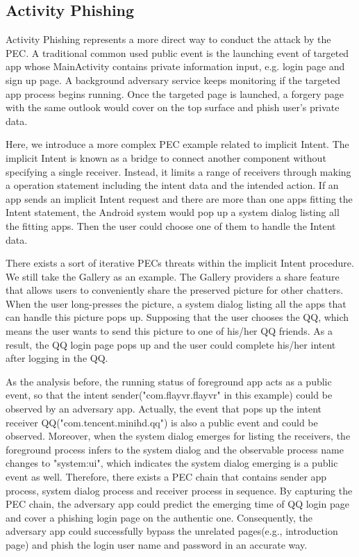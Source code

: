 \documentclass{sig-alternate-05-2015}
\begin{document}
\subsection{Activity Phishing}
Activity Phishing represents a more direct way to conduct the attack by the PEC. A traditional common used public event is the launching event of targeted app whose MainActivity contains private information input, e.g. login page and sign up page. A background adversary service keeps monitoring if the targeted app process begins running. Once the targeted page is launched, a forgery page with the same outlook would cover on the top surface and phish user's private data.

Here, we introduce a more complex PEC example related to implicit Intent. The implicit Intent is known as a bridge to connect another component without specifying a single receiver. Instead, it limits a range of receivers through making a operation statement including the intent data and the intended action. If an app sends an implicit Intent request and there are more than one apps fitting the Intent statement, the Android system would pop up a system dialog listing all the fitting apps. Then the user could choose one of them to handle the Intent data.

There exists a sort of iterative PECs threats within the implicit Intent procedure. We still take the Gallery as an example. The Gallery providers a share feature that allows users to conveniently share the preserved picture for other chatters. When the user long-presses the picture, a system dialog listing all the apps that can handle this picture pops up. Supposing that the user chooses the QQ, which means the user wants to send this picture to one of his/her QQ friends. As a result, the QQ login page pops up and the user could complete his/her intent after logging in the QQ.

As the analysis before, the running status of foreground app acts as a public event, so that the intent sender("com.flayvr.flayvr" in this example) could be observed by an adversary app. Actually, the event that pops up the intent receiver QQ("com.tencent.minihd.qq") is also a public event and could be observed. Moreover, when the system dialog emerges for listing the receivers, the foreground process infers to the system dialog and the observable process name changes to "system:ui", which indicates the system dialog emerging is a public event as well. Therefore, there exists a PEC chain that contains sender app process, system dialog process and receiver process in sequence. By capturing the PEC chain, the adversary app could predict the emerging time of QQ login page and cover a phishing login page on the authentic one. Consequently, the adversary app could successfully bypass the unrelated pages(e.g., introduction page) and phish the login user name and password in an accurate way.
\end{document}
